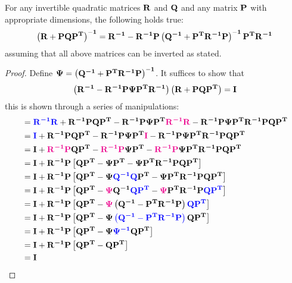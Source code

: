 \documentclass[12pt]{article}
\begin{document}
\begin{lem}
For any invertible quadratic matrices $\mat{R}$ and $\mat{Q}$ and any matrix $\mat{P}$ with appropriate dimensions, the following holds true:
\begin{equation}
\parentheses{\mat{R} + \mat{PQ}\matT{P}}^\mathbf{{-1}} = \mat{R^{-1}} - \mat{R^{-1}}\mat{P}\parentheses{\mat{Q^{-1}} + \matT{P}\mat{R^{-1}P}}^\mathbf{{-1}}\matT{P}\mat{R^{-1}}
\end{equation}
assuming that all above matrices can be inverted as stated.

\begin{proof}
Define $\mat{\Psi} = \parentheses{\mat{Q^{-1}} + \matT{P}\mat{R^{-1}}\mat{P}}^\mathbf{-1}$. It suffices to show that
\begin{equation*}
\parentheses{\mat{R^{-1}} - \mat{R^{-1}}\mat{P}\mat{\Psi}\matT{P}\mat{R^{-1}}} \parentheses{\mat{R} + \mat{PQ}\matT{P}} = \mat{I}
\end{equation*}
this is shown through a series of manipulations:
\begin{equation}
\begin{aligned}
    &= \blue{\mat{R^{-1} R}} + \mat{R^{-1} P Q P^T} - \mat{R^{-1} P \Psi P^T \magenta{R^{-1} R}} - \mat{R^{-1} P \Psi P^T R^{-1} P Q P^T} \\
    &= \blue{\mat{I}} + \mat{R^{-1} P Q P^T} - \mat{R^{-1} P \Psi P^T \magenta{I}} - \mat{R^{-1} P \Psi P^T R^{-1} P Q P^T}\\
    &= \mat{I} + \mat{\magenta{R^{-1} P} Q P^T} - \mat{\magenta{R^{-1} P} \Psi P^T} - \mat{\magenta{R^{-1} P} \Psi P^T R^{-1} P Q P^T}\\
    &= \mat{I} + \mat{R^{-1} P} \left[\mat{Q P^T} - \mat{\Psi P^T} - \mat{\Psi P^T R^{-1} P Q P^T}\right]\\
    &= \mat{I} + \mat{R^{-1} P} \left[\mat{Q P^T} - \mat{\Psi \blue{Q^{-1} Q} P^T} - \mat{\Psi P^T R^{-1} P Q P^T}\right]\\
    &= \mat{I} + \mat{R^{-1} P} \left[\mat{Q P^T} - \mat{\magenta{\Psi} Q^{-1}\blue{ Q P^T}} - \mat{\magenta{\Psi} P^T R^{-1} P \blue{Q P^T}}\right]\\
    &= \mat{I} + \mat{R^{-1} P} \left[\mat{Q P^T} - \mat{\magenta{\Psi}} \left(\mat{ Q^{-1}} - \mat{P^T R^{-1} P}\right)\mat{\blue{Q P^T}}\right]\\
    &= \mat{I} + \mat{R^{-1} P} \left[\mat{Q P^T} - \mat{\Psi} \blue{\left(\mat{ Q^{-1}} - \mat{P^T R^{-1} P}\right)}\mat{Q P^T}\right]\\
    &= \mat{I} + \mat{R^{-1} P} \left[\mat{Q P^T} - \mat{\Psi} \blue{\mat{\Psi^{-1}}}\mat{Q P^T}\right]\\
    &= \mat{I} + \mat{R^{-1} P} \left[\mat{Q P^T} - \mat{Q P^T}\right]\\
    &= \mat{I} 
\end{aligned}
\end{equation}

\end{proof}
\label{lem:inversion-lemma}

\end{lem}



\end{document}
